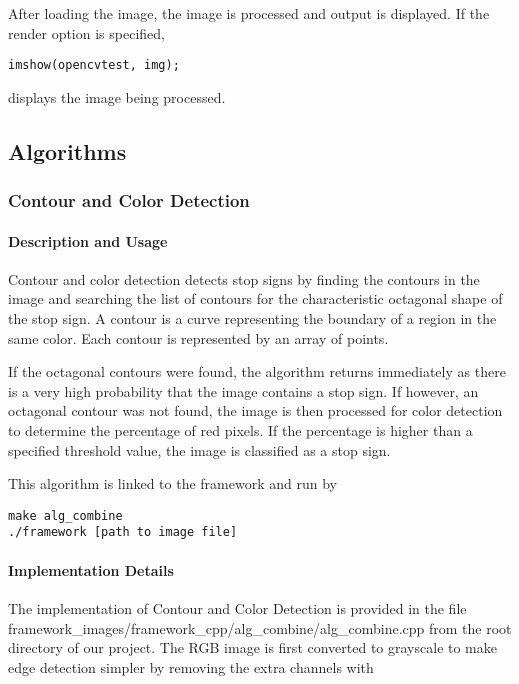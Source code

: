 \documentclass[letterpaper,10pt,titlepage]{article}
\begin{document}
After loading the image, the image is processed and output is displayed. If
the render option is specified, 

\begin{lstlisting}
imshow(opencvtest, img);
\end{lstlisting}

displays the image being processed.
\subsection*{Algorithms}

\subsubsection*{Contour and Color Detection}
\paragraph*{Description and Usage}
Contour and color detection detects stop signs by finding the contours in the
image and searching the list of contours for the characteristic octagonal 
shape of the stop sign. A contour is a curve representing the boundary of a
region in the same color. Each contour is represented by an array of points.

If the octagonal contours were found, the algorithm returns immediately as 
there is a very high probability that the image contains a stop sign. If 
however, an octagonal contour was not found, the image is then processed for 
color detection to determine the percentage of red pixels. If the percentage is
higher than a specified threshold value, the image is classified as a stop 
sign.

This algorithm is linked to the framework and run by

\begin{lstlisting}
make alg_combine
./framework [path to image file]
\end{lstlisting}

\paragraph*{Implementation Details}
The implementation of Contour and Color Detection is provided in the file 
framework\_images/framework\_cpp/alg\_combine/alg\_combine.cpp from the root 
directory of our project. The RGB image is first converted to grayscale to make
edge detection simpler by removing the extra channels with 
\end{document}
